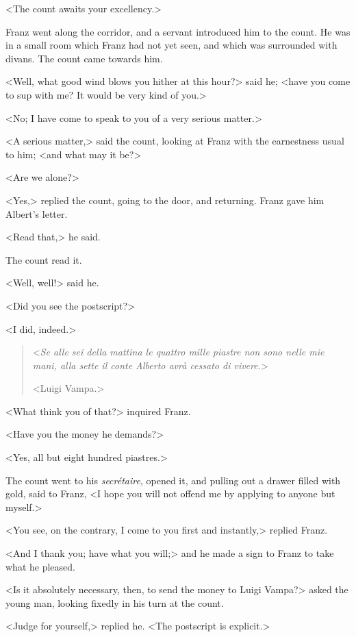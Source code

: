  <The count awaits your excellency.> 

 Franz went along the corridor, and a servant introduced him to the count. He was in a small room which Franz had not yet seen, and which was surrounded with divans. The count came towards him. 

 <Well, what good wind blows you hither at this hour?> said he; <have you come to sup with me? It would be very kind of you.> 

 <No; I have come to speak to you of a very serious matter.> 

 <A serious matter,> said the count, looking at Franz with the earnestness usual to him; <and what may it be?> 

 <Are we alone?> 

 <Yes,> replied the count, going to the door, and returning. Franz gave him Albert's letter. 

 <Read that,> he said. 

 The count read it. 

 <Well, well!> said he. 

 <Did you see the postscript?> 

<I did, indeed.>

\begin{quotation}
 <\textit{Se alle sei della mattina le quattro mille piastre non sono nelle mie mani, alla sette il conte Alberto avrà cessato di vivere.}>

<Luigi Vampa.>
\end{quotation}

 <What think you of that?> inquired Franz. 

 <Have you the money he demands?> 

 <Yes, all but eight hundred piastres.> 

 The count went to his \textit{secrétaire}, opened it, and pulling out a drawer filled with gold, said to Franz, <I hope you will not offend me by applying to anyone but myself.> 

 <You see, on the contrary, I come to you first and instantly,> replied Franz. 

 <And I thank you; have what you will;> and he made a sign to Franz to take what he pleased. 

 <Is it absolutely necessary, then, to send the money to Luigi Vampa?> asked the young man, looking fixedly in his turn at the count. 

 <Judge for yourself,> replied he. <The postscript is explicit.> 

